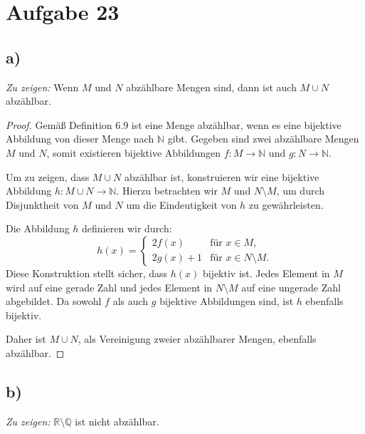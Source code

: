 \documentclass{article}
\theoremstyle{definition}
\theoremstyle{remark}
\begin{document}
\section*{Aufgabe 23}

\subsection*{a)}

\textit{Zu zeigen:} Wenn \( M \) und \( N \) abzählbare Mengen sind, dann ist auch \( M \cup N \) abzählbar.

\begin{proof}
	Gemäß Definition 6.9 ist eine Menge abzählbar, wenn es eine bijektive Abbildung von dieser Menge nach \(\mathbb{N}\) gibt. Gegeben sind zwei abzählbare Mengen \( M \) und \( N \), somit existieren bijektive Abbildungen \( f: M \to \mathbb{N} \) und \( g: N \to \mathbb{N} \).

	Um zu zeigen, dass \( M \cup N \) abzählbar ist, konstruieren wir eine bijektive Abbildung \( h: M \cup N \to \mathbb{N} \). Hierzu betrachten wir \( M \) und \( N \setminus M \), um durch Disjunktheit von \( M \) und \( N \) um die Eindeutigkeit von \( h \) zu gewährleisten.

	Die Abbildung \( h \) definieren wir durch:
	\[
		h(x) =
		\begin{cases}
			2f(x)     & \text{für } x \in M,             \\
			2g(x) + 1 & \text{für } x \in N \setminus M.
		\end{cases}
	\]
	Diese Konstruktion stellt sicher, dass \( h(x) \) bijektiv ist. Jedes Element in \( M \) wird auf eine gerade Zahl und jedes Element in \( N \setminus M \) auf eine ungerade Zahl abgebildet. Da sowohl \( f \) als auch \( g \) bijektive Abbildungen sind, ist \( h \) ebenfalls bijektiv.

	Daher ist \( M \cup N \), als Vereinigung zweier abzählbarer Mengen, ebenfalls abzählbar.
\end{proof}

\subsection*{b)}

\textit{Zu zeigen:} \( \mathbb{R} \setminus \mathbb{Q} \) ist nicht abzählbar.
\end{document}
